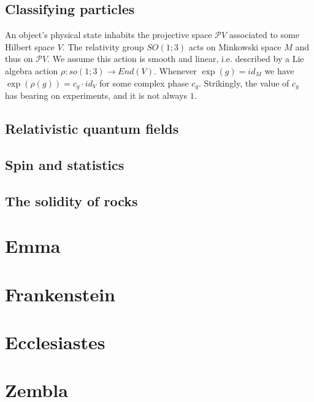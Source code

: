 \documentclass[justified]{tufte-book}
\newcommand{\mchp}[1]{\let\clearpage\relax\chapter{\color{mblu}\textsf{#1}}}
\newcommand{\msec}[1]{\section{\color{mblu}\textsf{#1}}}
\newcommand{\Pp}{\mathcal{P}}
\theoremstyle{definition}
\begin{document}
        \msec{Classifying particles}
            An object's physical state inhabits the projective space $\Pp V$
            associated to some Hilbert space $V$.  The relativity group
            $SO(1;3)$ acts on Minkowski space $M$ and thus on $\Pp V$.  We
            assume this action is smooth and linear, i.e. described by a Lie
            algebra action $\rho:so(1;3)\to End(V)$.  Whenever $\exp(g)=id_M$
            we have $\exp(\rho(g)) = c_g \cdot id_V$ for some complex phase
            $c_g$.  Strikingly, the value of $c_g$ has bearing on experiments,
            and it is not always $1$.

        \msec{Relativistic quantum fields}
        \msec{Spin and statistics}
        \msec{The solidity of rocks}

    \mchp{Emma}
    \mchp{Frankenstein}
    \mchp{Ecclesiastes}
    \mchp{Zembla}


\end{document}
